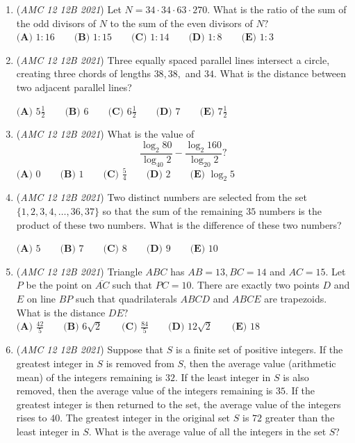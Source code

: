 \begin{enumerate}
 $\textbf{(A) }1.5 \qquad \textbf{(B) }3 \qquad \textbf{(C) }4 \qquad \textbf{(D) }4.5 \qquad \textbf{(E) }6$


	\item (\textit{AMC 12 12B 2021}) Let $N=34\cdot34\cdot63\cdot270.$ What is the ratio of the sum of the odd divisors of $N$ to the sum of the even divisors of $N?$
$\textbf{(A) }1:16 \qquad \textbf{(B) }1:15 \qquad \textbf{(C) }1:14 \qquad \textbf{(D) }1:8 \qquad \textbf{(E) }1:3$


	\item (\textit{AMC 12 12B 2021}) Three equally spaced parallel lines intersect a circle, creating three chords of lengths $38,38,$ and $34$. What is the distance between two adjacent parallel lines?


 $\textbf{(A) }5\frac12 \qquad \textbf{(B) }6 \qquad \textbf{(C) }6\frac12 \qquad \textbf{(D) }7 \qquad \textbf{(E) }7\frac12$


	\item (\textit{AMC 12 12B 2021}) What is the value of
 \[\frac{\log_2 80}{\log_{40}2}-\frac{\log_2 160}{\log_{20}2}?\]
$\textbf{(A) }0 \qquad \textbf{(B) }1 \qquad \textbf{(C) }\frac54 \qquad \textbf{(D) }2 \qquad \textbf{(E) }\log_2 5$


	\item (\textit{AMC 12 12B 2021}) Two distinct numbers are selected from the set $\{1,2,3,4,\dots,36,37\}$ so that the sum of the remaining $35$ numbers is the product of these two numbers. What is the difference of these two numbers?


 $\textbf{(A) }5 \qquad \textbf{(B) }7 \qquad \textbf{(C) }8\qquad \textbf{(D) }9 \qquad \textbf{(E) }10$


	\item (\textit{AMC 12 12B 2021}) Triangle $ABC$ has $AB=13,BC=14$ and $AC=15$. Let $P$ be the point on $\overline{AC}$ such that $PC=10$. There are exactly two points $D$ and $E$ on line $BP$ such that quadrilaterals $ABCD$ and $ABCE$ are trapezoids. What is the distance $DE?$
$\textbf{(A) }\frac{42}5 \qquad \textbf{(B) }6\sqrt2 \qquad \textbf{(C) }\frac{84}5\qquad \textbf{(D) }12\sqrt2 \qquad \textbf{(E) }18$


	\item (\textit{AMC 12 12B 2021}) Suppose that $S$ is a finite set of positive integers. If the greatest integer in $S$ is removed from $S$, then the average value (arithmetic mean) of the integers remaining is $32$. If the least integer in $S$ is also removed, then the average value of the integers remaining is $35$. If the greatest integer is then returned to the set, the average value of the integers rises to $40$. The greatest integer in the original set $S$ is $72$ greater than the least integer in $S$. What is the average value of all the integers in the set $S$?



\end{enumerate}
